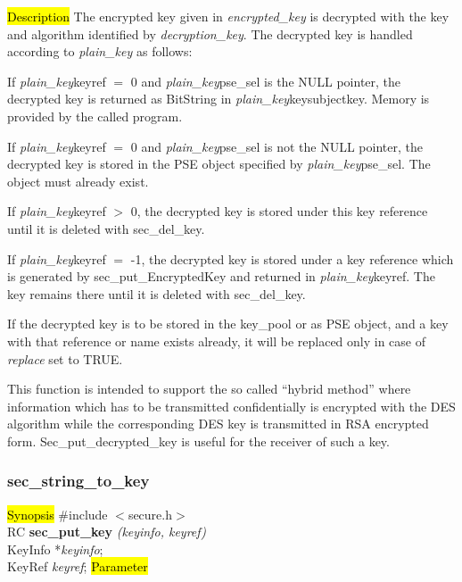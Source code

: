 

\hl{Description}
The encrypted key given in {\em encrypted\_key} is decrypted with the key and algorithm identified by
{\em decryption\_key}. The decrypted key is handled according to {\em plain\_key} as follows: 

If {\em plain\_key}\pf keyref $=$ 0 and {\em plain\_key}\pf pse\_sel is the NULL pointer, the decrypted key is
returned as BitString in {\em plain\_key}\pf key\pf subjectkey. Memory is provided by the called program. 

If {\em plain\_key}\pf keyref $=$ 0 and {\em plain\_key}\pf pse\_sel is not the NULL pointer, the decrypted key
is stored in the PSE object specified by {\em plain\_key}\pf pse\_sel. The object must already exist. 

If {\em plain\_key}\pf keyref $>$ 0, the decrypted key is stored under this key reference until it is
deleted with sec\_del\_key. 

If {\em plain\_key}\pf keyref $=$ -1, the decrypted key is stored under a key reference which is generated 
by sec\_put\_EncryptedKey and returned in {\em plain\_key}\pf keyref. The key remains there until it is deleted
with sec\_del\_key. 

If the decrypted key is to be stored in the key\_pool or as PSE object, and a key with that
reference or name exists already, it will be replaced only in case of {\em replace} set to TRUE.

This function is intended to support the so called ``hybrid method'' where information which
has to be transmitted confidentially is encrypted with the DES algorithm while the corresponding DES key
is transmitted in RSA encrypted form. Sec\_put\_decrypted\_key is useful for the receiver
of such a key.

\subsubsection{sec\_string\_to\_key}
\label{sec_put_key}
\hl{Synopsis}
\#include $<$secure.h$>$ \\ [0.5cm]
RC {\bf sec\_put\_key} {\em (keyinfo, keyref)} \\
KeyInfo *{\em keyinfo}; \\
KeyRef {\em keyref};
\hl{Parameter}

